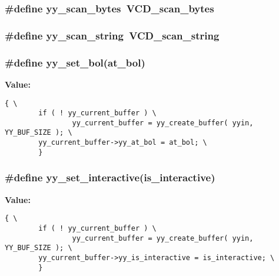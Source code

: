 \subsubsection{\setlength{\rightskip}{0pt plus 5cm}\#define yy\_\-scan\_\-bytes\ VCD\_\-scan\_\-bytes}\label{vcd__lexer_8c_a4}


\subsubsection{\setlength{\rightskip}{0pt plus 5cm}\#define yy\_\-scan\_\-string\ VCD\_\-scan\_\-string}\label{vcd__lexer_8c_a3}


\subsubsection{\setlength{\rightskip}{0pt plus 5cm}\#define yy\_\-set\_\-bol(at\_\-bol)}\label{vcd__lexer_8c_a43}


{\bf Value:}

\footnotesize\begin{verbatim}{ \
        if ( ! yy_current_buffer ) \
                yy_current_buffer = yy_create_buffer( yyin, YY_BUF_SIZE ); \
        yy_current_buffer->yy_at_bol = at_bol; \
        }\end{verbatim}\normalsize 
{}
\subsubsection{\setlength{\rightskip}{0pt plus 5cm}\#define yy\_\-set\_\-interactive(is\_\-interactive)}\label{vcd__lexer_8c_a42}


{\bf Value:}

\footnotesize\begin{verbatim}{ \
        if ( ! yy_current_buffer ) \
                yy_current_buffer = yy_create_buffer( yyin, YY_BUF_SIZE ); \
        yy_current_buffer->yy_is_interactive = is_interactive; \
        }\end{verbatim}\normalsize 
{}
